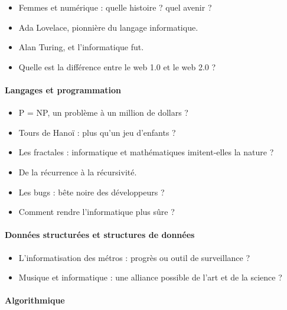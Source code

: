 \documentclass[
  letterpaper,
  DIV=11,
  numbers=noendperiod]{scrartcl}
\let\oldparagraph\paragraph
\renewcommand{\paragraph}[1]{\oldparagraph{#1}\mbox{}}
\providecommand{\tightlist}{%
  \setlength{\itemsep}{0pt}\setlength{\parskip}{0pt}}\usepackage{longtable,booktabs,array}
\begin{document}
\begin{itemize}
\tightlist
\item
  Femmes et numérique : quelle histoire ? quel avenir ?
\item
  Ada Lovelace, pionnière du langage informatique.
\item
  Alan Turing, et l'informatique fut.
\item
  Quelle est la différence entre le web 1.0 et le web 2.0 ?
\end{itemize}

\hypertarget{langages-et-programmation}{%
\paragraph{Langages et programmation}\label{langages-et-programmation}}

\begin{itemize}
\tightlist
\item
  P = NP, un problème à un million de dollars ?
\item
  Tours de Hanoï : plus qu'un jeu d'enfants ?
\item
  Les fractales : informatique et mathématiques imitent-elles la nature
  ?
\item
  De la récurrence à la récursivité.
\item
  Les bugs : bête noire des développeurs ?
\item
  Comment rendre l'informatique plus sûre ?
\end{itemize}

\hypertarget{donnuxe9es-structuruxe9es-et-structures-de-donnuxe9es}{%
\paragraph{Données structurées et structures de
données}\label{donnuxe9es-structuruxe9es-et-structures-de-donnuxe9es}}

\begin{itemize}
\tightlist
\item
  L'informatisation des métros : progrès ou outil de surveillance ?
\item
  Musique et informatique : une alliance possible de l'art et de la
  science ?
\end{itemize}

\hypertarget{algorithmique}{%
\paragraph{Algorithmique}\label{algorithmique}}
\end{document}
